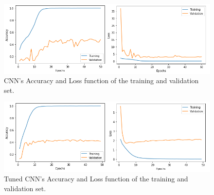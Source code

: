 \begin{figure}[ht]
\centering
\includegraphics[scale=0.6]{images/2021-val-train.png}
\caption{CNN's Accuracy and Loss function of the training and validation set.}
\label{fig:Acc_Loss_2021}
\end{figure}


\begin{figure}[ht]
\centering
\includegraphics[scale=0.6]{images/tuned-val-train.png}
\caption{Tuned CNN's Accuracy and Loss function of the training and validation set.}
\label{fig:Acc_Loss_tuned}
\end{figure}